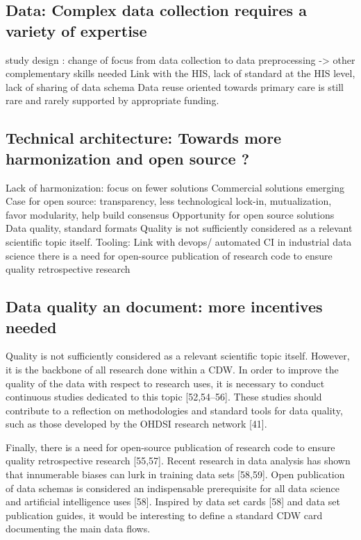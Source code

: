 \documentclass{report}
\begin{document}
\subsection{Data: Complex data collection requires a variety of
  expertise}\label{subsec:cdw:recommendations:data} study design : change of
focus from data collection to data preprocessing -> other complementary skills
needed Link with the HIS, lack of standard at the HIS level, lack of sharing of
data schema Data reuse oriented towards primary care is still rare and rarely
supported by appropriate funding.


\subsection{Technical architecture: Towards more harmonization and open source ?
}\label{subsec:cdw:recommendations:architecture} Lack of harmonization: focus on
fewer solutions Commercial solutions emerging Case for open source:
transparency, less technological lock-in, mutualization, favor modularity, help
build consensus Opportunity for open source solutions Data quality, standard
formats Quality is not sufficiently considered as a relevant scientific topic
itself. Tooling: Link with devops/ automated CI in industrial data science there
is a need for open-source publication of research code to ensure quality
retrospective research

\subsection{Data quality an document: more incentives needed}\label{subsec:cdw:recommendations:quality}

Quality is not sufficiently considered as a relevant scientific topic itself.
However, it is the backbone of all research done within a CDW. In order to
improve the quality of the data with respect to research uses, it is necessary
to conduct continuous studies dedicated to this topic [52,54–56]. These studies
should contribute to a reflection on methodologies and standard tools for data
quality, such as those developed by the OHDSI research network [41].

Finally, there is a need for open-source publication of research code to ensure
quality retrospective research [55,57]. Recent research in data analysis has
shown that innumerable biases can lurk in training data sets [58,59]. Open
publication of data schemas is considered an indispensable prerequisite for all
data science and artificial intelligence uses [58]. Inspired by data set cards
  [58] and data set publication guides, it would be interesting to define a
standard CDW card documenting the main data flows.
\end{document}

